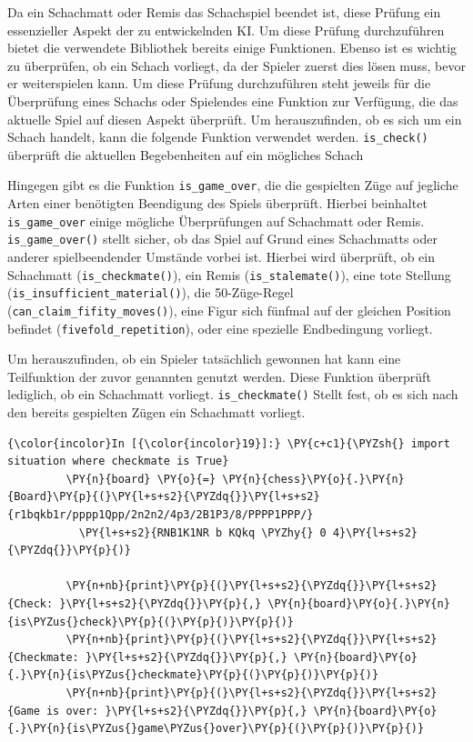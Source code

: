 Da ein Schachmatt oder Remis das Schachspiel beendet ist, diese Prüfung
ein essenzieller Aspekt der zu entwickelnden KI. Um diese Prüfung
durchzuführen bietet die verwendete Bibliothek bereits einige
Funktionen. Ebenso ist es wichtig zu überprüfen, ob ein Schach vorliegt,
da der Spieler zuerst dies lösen muss, bevor er weiterspielen kann. Um
diese Prüfung durchzuführen steht jeweils für die Überprüfung eines
Schachs oder Spielendes eine Funktion zur Verfügung, die das aktuelle
Spiel auf diesen Aspekt überprüft. Um herauszufinden, ob es sich um ein
Schach handelt, kann die folgende Funktion verwendet werden.
\texttt{is\_check()} überprüft die aktuellen Begebenheiten auf ein
mögliches Schach

Hingegen gibt es die Funktion \texttt{is\_game\_over}, die die
gespielten Züge auf jegliche Arten einer benötigten Beendigung des
Spiels überprüft. Hierbei beinhaltet \texttt{is\_game\_over} einige
mögliche Überprüfungen auf Schachmatt oder Remis.
\texttt{is\_game\_over()} stellt sicher, ob das Spiel auf Grund eines
Schachmatts oder anderer spielbeendender Umstände vorbei ist. Hierbei
wird überprüft, ob ein Schachmatt (\texttt{is\_checkmate()}), ein Remis
(\texttt{is\_stalemate()}), eine tote Stellung
(\texttt{is\_insufficient\_material()}), die 50-Züge-Regel
(\texttt{can\_claim\_fifity\_moves()}), eine Figur sich fünfmal auf der gleichen
Position befindet (\texttt{fivefold\_repetition}), oder eine
spezielle Endbedingung vorliegt.

Um herauszufinden, ob ein Spieler tatsächlich gewonnen hat kann eine
Teilfunktion der zuvor genannten genutzt werden. Diese Funktion
überprüft lediglich, ob ein Schachmatt vorliegt.
\texttt{is\_checkmate()} Stellt fest, ob es sich nach den bereits
gespielten Zügen ein Schachmatt vorliegt.

    \begin{Verbatim}[commandchars=\\\{\}]
{\color{incolor}In [{\color{incolor}19}]:} \PY{c+c1}{\PYZsh{} import situation where checkmate is True}
         \PY{n}{board} \PY{o}{=} \PY{n}{chess}\PY{o}{.}\PY{n}{Board}\PY{p}{(}\PY{l+s+s2}{\PYZdq{}}\PY{l+s+s2}{r1bqkb1r/pppp1Qpp/2n2n2/4p3/2B1P3/8/PPPP1PPP/}
		   \PY{l+s+s2}{RNB1K1NR b KQkq \PYZhy{} 0 4}\PY{l+s+s2}{\PYZdq{}}\PY{p}{)}
         
         \PY{n+nb}{print}\PY{p}{(}\PY{l+s+s2}{\PYZdq{}}\PY{l+s+s2}{Check: }\PY{l+s+s2}{\PYZdq{}}\PY{p}{,} \PY{n}{board}\PY{o}{.}\PY{n}{is\PYZus{}check}\PY{p}{(}\PY{p}{)}\PY{p}{)}
         \PY{n+nb}{print}\PY{p}{(}\PY{l+s+s2}{\PYZdq{}}\PY{l+s+s2}{Checkmate: }\PY{l+s+s2}{\PYZdq{}}\PY{p}{,} \PY{n}{board}\PY{o}{.}\PY{n}{is\PYZus{}checkmate}\PY{p}{(}\PY{p}{)}\PY{p}{)}
         \PY{n+nb}{print}\PY{p}{(}\PY{l+s+s2}{\PYZdq{}}\PY{l+s+s2}{Game is over: }\PY{l+s+s2}{\PYZdq{}}\PY{p}{,} \PY{n}{board}\PY{o}{.}\PY{n}{is\PYZus{}game\PYZus{}over}\PY{p}{(}\PY{p}{)}\PY{p}{)}
\end{Verbatim}


